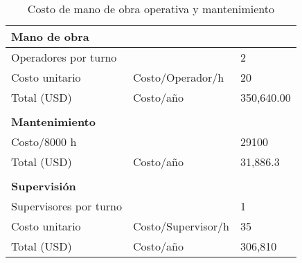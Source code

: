\begin{table}[H]
    \centering
    \caption{Costo de mano de obra operativa y mantenimiento}
    \label{tab:manodeobra}
    \begin{tabular}{l|l|l}
    \hline 
    \textbf{Mano de obra}  &                    &            \\ \hline 
    Operadores por turno   &                    & 2          \\
    Costo unitario         & Costo/Operador/h   & 20         \\ \hline
    Total (USD)            & Costo/año          & 350,640.00 \\
                           &                    &            \\ \hline 
    \textbf{Mantenimiento} &                    &            \\ \hline 
    Costo/8000 h           &                    & 29100      \\ \hline 
    Total (USD)            & Costo/año          & 31,886.3   \\
                           &                    &            \\ \hline 
    \textbf{Supervisión}   &                    &            \\ \hline 
    Supervisores por turno &                    & 1          \\
    Costo unitario         & Costo/Supervisor/h & 35         \\ \hline
    Total (USD)                 & Costo/año          & 306,810   \\ \hline 
    \end{tabular}
\end{table}